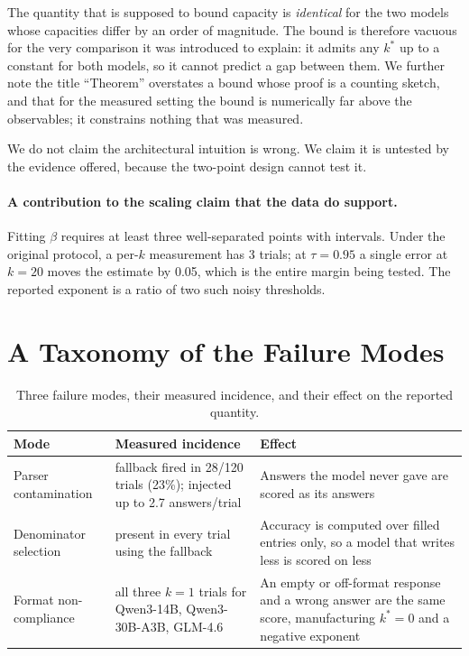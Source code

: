 \documentclass[preprint,12pt]{elsarticle}
\theoremstyle{plain}
\begin{document}
The quantity that is supposed to bound capacity is \emph{identical} for the two models whose capacities differ by an order of magnitude. The bound is therefore vacuous for the very comparison it was introduced to explain: it admits any $k^*$ up to a constant for both models, so it cannot predict a gap between them. We further note the title ``Theorem'' overstates a bound whose proof is a counting sketch, and that for the measured setting the bound is numerically far above the observables; it constrains nothing that was measured.

We do not claim the architectural intuition is wrong. We claim it is untested by the evidence offered, because the two-point design cannot test it.

\paragraph{A contribution to the scaling claim that the data do support.} Fitting $\beta$ requires at least three well-separated points with intervals. Under the original protocol, a per-$k$ measurement has 3 trials; at $\tau = 0.95$ a single error at $k = 20$ moves the estimate by 0.05, which is the entire margin being tested. The reported exponent is a ratio of two such noisy thresholds.

\section{A Taxonomy of the Failure Modes}
\label{sec:taxonomy}

\begin{table}[H]
\centering
\small
\caption{Three failure modes, their measured incidence, and their effect on the reported quantity.}
\label{tab:taxonomy}
\begin{tabular}{p{}p{}p{}}
\toprule
Mode & Measured incidence & Effect \\
\midrule
Parser contamination & fallback fired in 28/120 trials (23\%); injected up to 2.7 answers/trial & Answers the model never gave are scored as its answers \\
Denominator selection & present in every trial using the fallback & Accuracy is computed over filled entries only, so a model that writes less is scored on less \\
Format non-compliance & all three $k=1$ trials for Qwen3-14B, Qwen3-30B-A3B, GLM-4.6 & An empty or off-format response and a wrong answer are the same score, manufacturing $k^*=0$ and a negative exponent \\
\bottomrule
\end{tabular}
\end{table}
\end{document}
